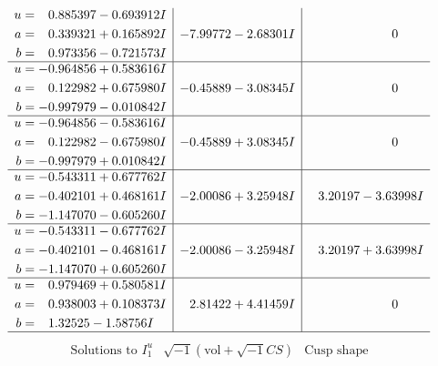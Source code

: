 \documentclass[1p]{elsarticle_modified}
\theoremstyle{definition}
\newcommand{\I}{\sqrt{-1}}
\begin{document}
$$\begin{array}{c|c|c}
\begin{aligned}
u &= \phantom{-}0.885397 - 0.693912 I \\
a &= \phantom{-}0.339321 + 0.165892 I \\
b &= \phantom{-}0.973356 - 0.721573 I\end{aligned}
 & -7.99772 - 2.68301 I & \phantom{-0.000000 } 0 \\ \hline\begin{aligned}
u &= -0.964856 + 0.583616 I \\
a &= \phantom{-}0.122982 + 0.675980 I \\
b &= -0.997979 - 0.010842 I\end{aligned}
 & -0.45889 - 3.08345 I & \phantom{-0.000000 } 0 \\ \hline\begin{aligned}
u &= -0.964856 - 0.583616 I \\
a &= \phantom{-}0.122982 - 0.675980 I \\
b &= -0.997979 + 0.010842 I\end{aligned}
 & -0.45889 + 3.08345 I & \phantom{-0.000000 } 0 \\ \hline\begin{aligned}
u &= -0.543311 + 0.677762 I \\
a &= -0.402101 + 0.468161 I \\
b &= -1.147070 - 0.605260 I\end{aligned}
 & -2.00086 + 3.25948 I & \phantom{-}3.20197 - 3.63998 I \\ \hline\begin{aligned}
u &= -0.543311 - 0.677762 I \\
a &= -0.402101 - 0.468161 I \\
b &= -1.147070 + 0.605260 I\end{aligned}
 & -2.00086 - 3.25948 I & \phantom{-}3.20197 + 3.63998 I \\ \hline\begin{aligned}
u &= \phantom{-}0.979469 + 0.580581 I \\
a &= \phantom{-}0.938003 + 0.108373 I \\
b &= \phantom{-}1.32525 - 1.58756 I\end{aligned}
 & \phantom{-}2.81422 + 4.41459 I & \phantom{-0.000000 } 0\\
 \hline 
 \end{array}$$\newpage$$\begin{array}{c|c|c}  
\text{Solutions to }I^u_{1}& \I (\text{vol} + \sqrt{-1}CS) & \text{Cusp shape}\\
 \hline 
\begin{aligned}

\end{aligned}
\end{array}$$
\end{document}

